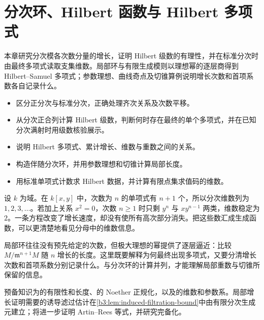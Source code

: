 
\chapter{分次环、Hilbert 函数与 Hilbert 多项式}
\label{b3:ch:11}

\begin{chapterabstract}
	本章研究分次模各次数分量的增长，证明 Hilbert 级数的有理性，并在标准分次时由最终多项式读取支集维数。局部环与有限生成模则以理想幂的逐层商得到 Hilbert–Samuel 多项式；参数理想、曲线奇点及切锥算例说明增长次数和首项系数各自记录什么。
\end{chapterabstract}

\begin{learninggoals}
	\begin{itemize}
		\item 区分正分次与标准分次，正确处理齐次关系及次数平移。
		\item 从分次正合列计算 Hilbert 级数，判断何时存在最终的单个多项式，并在已知分次满射时用级数核验展示。
		\item 说明 Hilbert 多项式、累计增长、维数与重数之间的关系。
		\item 构造伴随分次环，并用参数理想和切锥计算局部长度。
		\item 用标准单项式计数求 Hilbert 数据，并计算有限点集求值码的维数。
	\end{itemize}
\end{learninggoals}

设 \(k\) 为域。在 \(k[x,y]\) 中，次数为 \(n\) 的单项式有 \(n+1\) 个，所以分次维数列为 \(1,2,3,\ldots\)。若加上关系 \(x^2=0\)，次数 \(n\ge1\) 时只剩 \(y^n\) 与 \(xy^{n-1}\) 两类，维数稳定为 \(2\)。一条方程改变了增长速度，却没有使所有高次部分消失。把这些数汇成生成函数，可以更清楚地看见分母中的维数信息。

\ProseParagraphBreak

局部环往往没有预先给定的次数，但极大理想的幂提供了逐层逼近：比较 \(M/\mathfrak m^{n+1}M\) 随 \(n\) 增长的长度。这里既要解释为何最终出现多项式，又要分清增长次数和首项系数分别记录什么。与分次环的计算并列，才能理解局部重数与切锥所保留的信息。

\ProseParagraphBreak

预备知识为的有限性和长度、的 Noether 正规化，以及的维数和参数系。局部增长证明需要的诱导滤过估计在\cref{b3:lem:induced-filtration-bound}中由有限分次生成元建立；将进一步证明 Artin–Rees 等式，并研究完备化。

